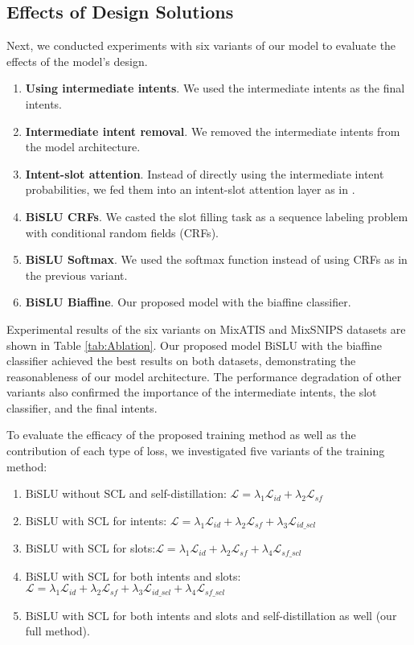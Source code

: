 \documentclass{ecai}
\begin{document}
\subsection{Effects of Design Solutions}

Next, we conducted experiments with six variants of our model to evaluate the effects of the model’s design.
\begin{enumerate}
    \item \textbf{Using intermediate intents}. We used the intermediate intents as the final intents. 
    \item \textbf{Intermediate intent removal}. We removed the intermediate intents from the model architecture. 
    \item \textbf{Intent-slot attention}. Instead of directly using the intermediate intent probabilities, we fed them into an intent-slot attention layer as in \cite{Dao:2021}.
    \item \textbf{BiSLU CRFs}. We casted the slot filling task as a sequence labeling problem with conditional random fields (CRFs).
    \item \textbf{BiSLU Softmax}. We used the softmax function instead of using CRFs as in the previous variant. 
    \item \textbf{BiSLU Biaffine}. Our proposed model with the biaffine classifier. 
\end{enumerate}

Experimental results of the six variants on MixATIS and MixSNIPS datasets are shown in Table \ref{tab:Ablation}. Our proposed model BiSLU with the biaffine classifier achieved the best results on both datasets, demonstrating the reasonableness of our model architecture. The performance degradation of other variants also confirmed the importance of the intermediate intents, the slot classifier, and the final intents.  

To evaluate the efficacy of the proposed training method as well as the contribution of each type of loss, we investigated five variants of the training method:
\begin{enumerate}
    \item BiSLU without SCL and self-distillation: $\mathcal{L}=  \lambda_1 \mathcal{L}_{id} + \lambda_2 \mathcal{L}_{sf}$
    \item BiSLU with SCL for intents: $\mathcal{L}=  \lambda_1 \mathcal{L}_{id} + \lambda_2 \mathcal{L}_{sf} + \lambda_3 \mathcal{L}_{id\_scl}$
    \item BiSLU with SCL for slots:$\mathcal{L}=  \lambda_1 \mathcal{L}_{id} + \lambda_2 \mathcal{L}_{sf} +  \lambda_4 \mathcal{L}_{sf\_scl}$
    \item BiSLU with SCL for both intents and slots:$\mathcal{L}=  \lambda_1 \mathcal{L}_{id} + \lambda_2 \mathcal{L}_{sf} + \lambda_3 \mathcal{L}_{id\_scl} + \lambda_4 \mathcal{L}_{sf\_scl}$
    \item BiSLU with SCL for both intents and slots and self-distillation as well (our full method).   
\end{enumerate}
\end{document}
